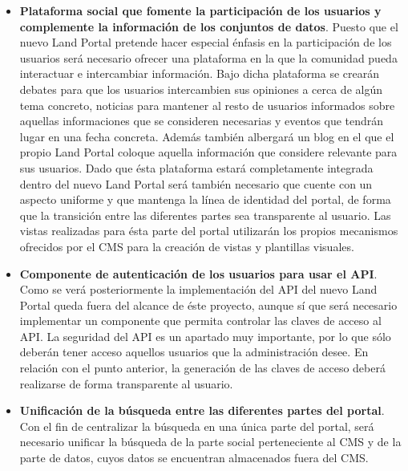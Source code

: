\begin{itemize}
\item \textbf{Plataforma social que fomente la participación de los usuarios y complemente la información de los conjuntos de datos}.  Puesto que el nuevo Land Portal pretende hacer especial énfasis en la participación de los usuarios será necesario ofrecer una plataforma en la que la comunidad pueda interactuar e intercambiar información.  Bajo dicha plataforma se crearán debates para que los usuarios intercambien sus opiniones a cerca de algún tema concreto, noticias para mantener al resto de usuarios informados sobre aquellas informaciones que se consideren necesarias y eventos que tendrán lugar en una fecha concreta.  Además también albergará un blog en el que el propio Land Portal coloque aquella información que considere relevante para sus usuarios.\newline
Dado que ésta plataforma estará completamente integrada dentro del nuevo Land Portal será también necesario que cuente con un aspecto uniforme y que mantenga la línea de identidad del portal, de forma que la transición entre las diferentes partes sea transparente al usuario.  Las vistas realizadas para ésta parte del portal utilizarán los propios mecanismos ofrecidos por el CMS para la creación de vistas y plantillas visuales. 
\item \textbf{Componente de autenticación de los usuarios para usar el API}.  Como se verá posteriormente la implementación del API del nuevo Land Portal queda fuera del alcance de éste proyecto, aunque sí que será necesario implementar un componente que permita controlar las claves de acceso al API.  La seguridad del API es un apartado muy importante, por lo que sólo deberán tener acceso aquellos usuarios que la administración desee.  En relación con el punto anterior, la generación de las claves de acceso deberá realizarse de forma transparente al usuario.
\item \textbf{Unificación de la búsqueda entre las diferentes partes del portal}.  Con el fin de centralizar la búsqueda en una única parte del portal, será necesario unificar la búsqueda de la parte social perteneciente al CMS y de la parte de datos, cuyos datos se encuentran almacenados fuera del CMS.
\end{itemize}


